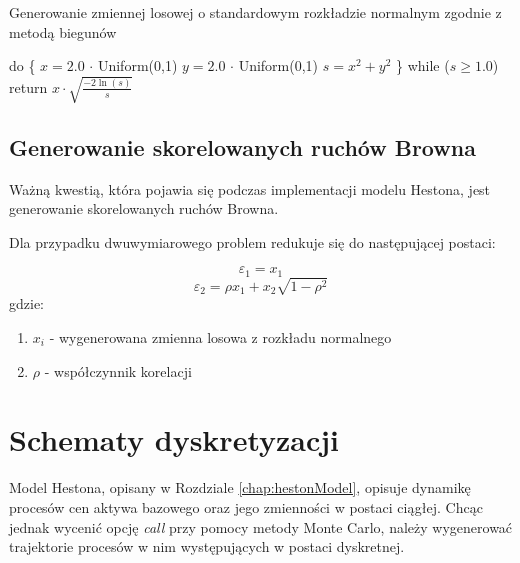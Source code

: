 \documentclass{pracamgr}
\begin{document}
\begin{algorithm}[H]
\caption{Generowanie zmiennej losowej o standardowym rozkładzie normalnym zgodnie z metodą biegunów}
\label{lst:polarMethodLst}

\begin{algorithmic}[1]

  \State do \{
  \State \hspace{\algorithmicindent} $x = 2.0$ $\cdot$ Uniform(0,1)
  \State \hspace{\algorithmicindent} $y = 2.0$ $\cdot$ Uniform(0,1)
  \State \hspace{\algorithmicindent} $s = x^2 + y^2$
  \State \}
  \State while ($s \geq 1.0$)
  \State return $x \cdot \sqrt{\frac{-2 \ln(s)}{s}}$

\end{algorithmic}
\label{alg:polarMethod}
\end{algorithm}





\subsection{Generowanie skorelowanych ruchów Browna}
\label{sec:genRB}

Ważną kwestią, która pojawia się podczas implementacji modelu Hestona, jest generowanie skorelowanych 
ruchów Browna.

Dla przypadku dwuwymiarowego problem redukuje się do 
następującej postaci:

\begin{equation}
  \varepsilon_1 = x_1
\end{equation}
\begin{equation}
  \varepsilon_2 = \rho x_1 + x_2 \sqrt{1-\rho^2}
\end{equation}
gdzie:
\begin{enumerate}
  \item $x_i$ - wygenerowana zmienna losowa z rozkładu normalnego
  \item $\rho$  - współczynnik korelacji
\end{enumerate}




\section{Schematy dyskretyzacji}


Model Hestona, opisany w Rozdziale \ref{chap:hestonModel}, opisuje dynamikę procesów cen aktywa 
bazowego oraz jego zmienności w postaci ciągłej.
Chcąc jednak wycenić opcję \textit{call} przy pomocy metody Monte Carlo, należy wygenerować 
trajektorie procesów w nim występujących w postaci dyskretnej. 
\end{document}
